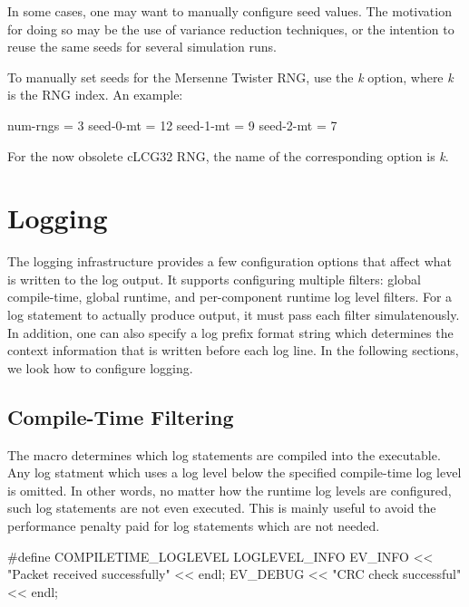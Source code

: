 In some cases, one may want to manually configure seed values. The
motivation for doing so may be the use of variance reduction techniques, or
the intention to reuse the same seeds for several simulation runs.

To manually set seeds for the Mersenne Twister RNG, use the \textit{k}
option, where \textit{k} is the RNG index. An example:

\begin{inifile}
[General]
num-rngs = 3
seed-0-mt = 12
seed-1-mt = 9
seed-2-mt = 7
\end{inifile}

\label{sec:config-sim:seedtool}

For the now obsolete cLCG32 RNG, the name of the corresponding option is
\textit{k}.

\section{Logging}
\label{sec:config-sim:logging}

The {\opp} logging infrastructure provides a few configuration options that
affect what is written to the log output. It supports configuring multiple
filters: global compile-time, global runtime, and per-component runtime log
level filters. For a log statement to actually produce output, it must pass
each filter simulatenously. In addition, one can also specify a log prefix
format string which determines the context information that is written before
each log line. In the following sections, we look how to configure logging.

\subsection{Compile-Time Filtering}
\label{sec:config-sim:compile-time-log-filtering}

The  macro determines which log statements
are compiled into the executable. Any log statment which uses a log level below
the specified compile-time log level is omitted. In other words, no matter how
the runtime log levels are configured, such log statements are not even executed.
This is mainly useful to avoid the performance penalty paid for log statements
which are not needed.

\begin{cpp}
#define COMPILETIME_LOGLEVEL LOGLEVEL_INFO
EV_INFO << "Packet received successfully" << endl;
EV_DEBUG << "CRC check successful" << endl;
\end{cpp}

